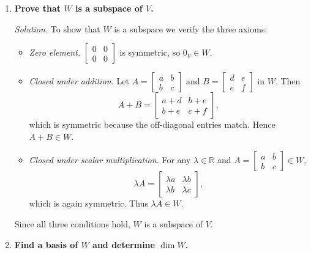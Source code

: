 \documentclass{article}
\begin{document}
\begin{multicols*}{2}
\begin{enumerate}[label=(\alph*)]

\item \textbf{Prove that $W$ is a subspace of $V$.}

\textit{Solution.}  
To show that $W$ is a subspace we verify the three axioms:

\begin{itemize}
\item \emph{Zero element.}  
$\begin{bmatrix}0&0\\0&0\end{bmatrix}$ is symmetric, so $0_V\in W$.

\item \emph{Closed under addition.}  
Let $A=\begin{bmatrix}a&b\\b&c\end{bmatrix}$ and $B=\begin{bmatrix}d&e\\e&f\end{bmatrix}$ in $W$.  
Then
$$
A+B = \begin{bmatrix} a+d & b+e \\ b+e & c+f \end{bmatrix},
$$
which is symmetric because the off-diagonal entries match. Hence $A+B\in W$.

\item \emph{Closed under scalar multiplication.}  
For any $\lambda\in\mathbb{R}$ and $A=\begin{bmatrix}a&b\\b&c\end{bmatrix}\in W$,
$$
\lambda A = \begin{bmatrix} \lambda a & \lambda b \\ \lambda b & \lambda c \end{bmatrix},
$$
which is again symmetric. Thus $\lambda A\in W$.
\end{itemize}
Since all three conditions hold, $W$ is a subspace of $V$.

\item \textbf{Find a basis of $W$ and determine $\dim W$.}


\end{enumerate}
\end{multicols*}
\end{document}
